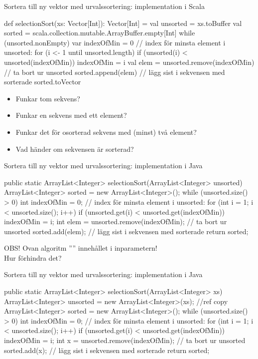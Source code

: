 \begin{Slide}{Sortera till ny vektor med urvalssortering: implementation i Scala}
\SlideFontTiny\vspace{-0.5em}
\begin{Code}
def selectionSort(xs: Vector[Int]): Vector[Int] = {
  val unsorted = xs.toBuffer
  val sorted = scala.collection.mutable.ArrayBuffer.empty[Int]
  while (unsorted.nonEmpty) {
    var indexOfMin = 0
    // index för minsta element i unsorted:
    for (i <- 1 until unsorted.length) {
      if (unsorted(i) < unsorted(indexOfMin)) indexOfMin = i
    }
    val elem = unsorted.remove(indexOfMin)  // ta bort ur unsorted
    sorted.append(elem)  // lägg sist i sekvensen med sorterade
  }
  sorted.toVector
}
\end{Code}
\pause
\begin{itemize}
\item Funkar tom sekvens?
\item Funkar en sekvens med ett element?
\item Funkar det för osorterad sekvens med (minst) två element?
\item Vad händer om sekvensen är sorterad?
\end{itemize}
\end{Slide}

\begin{Slide}{Sortera till ny vektor med urvalssortering: implementation i Java}
\begin{Code}[language=Java]
public static ArrayList<Integer> selectionSort(ArrayList<Integer> unsorted) {
    ArrayList<Integer> sorted = new ArrayList<Integer>();
    while (unsorted.size() > 0) {
        int indexOfMin = 0;
        // index för minsta element i unsorted:
        for (int i = 1; i < unsorted.size(); i++) {
            if (unsorted.get(i) < unsorted.get(indexOfMin)) {
                indexOfMin = i;
            }
        }
        int elem = unsorted.remove(indexOfMin);  // ta bort ur unsorted
        sorted.add(elem);  // lägg sist i sekvensen med sorterade
    }
    return sorted;
}
\end{Code}
OBS! Ovan algoritm '''' innehållet i inparametern! \\ Hur förhindra det?
\end{Slide}

\begin{Slide}{Sortera till ny vektor med urvalssortering: implementation i Java}
\begin{Code}[language=Java]
public static ArrayList<Integer> selectionSort(ArrayList<Integer> xs) {
    ArrayList<Integer> unsorted = new ArrayList<Integer>(xs); //ref copy
    ArrayList<Integer> sorted = new ArrayList<Integer>();
    while (unsorted.size() > 0) {
        int indexOfMin = 0;
        // index för minsta element i unsorted:
        for (int i = 1; i < unsorted.size(); i++) {
            if (unsorted.get(i) < unsorted.get(indexOfMin)) {
                indexOfMin = i;
            }
        }
        int x = unsorted.remove(indexOfMin);  // ta bort ur unsorted
        sorted.add(x);  // lägg sist i sekvensen med sorterade
    }
    return sorted;
}
\end{Code}
\end{Slide}

